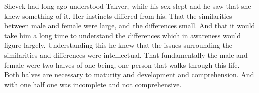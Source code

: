 Shevek had long ago understood Takver, while his sex slept and he saw
that she knew something of it.  Her instincts differed from his.  That
the similarities between male and female were large, and the
differences small.  And that it would take him a long time to
understand the differences which in awareness would figure largely.
Understanding this he knew that the issues surrounding the
similarities and differences were intelllectual.  That fundamentally
the male and female were two halves of one being, one person that
walks through this life.  Both halves are necessary to maturity and
development and comprehension.  And with one half one was incomplete
and not comprehensive.

